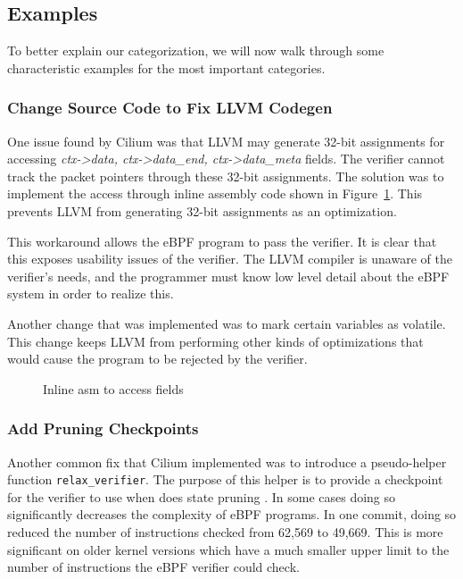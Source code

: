 \subsection{Examples}
To better explain our categorization, we will now walk through some characteristic examples for the most important categories.

\subsubsection{Change Source Code to Fix LLVM Codegen}
One issue found by Cilium was that LLVM may generate 32-bit assignments for accessing \emph{ctx->data, ctx->data\_end, ctx->data\_meta} fields.
The verifier cannot track the packet pointers through these 32-bit assignments.
The solution was to implement the access through inline assembly code shown in Figure~\ref{fig:inline-asm}.
This prevents LLVM from generating 32-bit assignments as an optimization.



This workaround allows the eBPF program to pass the verifier.
It is clear that this exposes usability issues of the verifier.
The LLVM compiler is unaware of the verifier's needs, and the programmer must know low level detail about the eBPF system in order to realize this.

Another change that was implemented was to mark certain variables as volatile.
This change keeps LLVM from performing other kinds of optimizations that would cause the program to be rejected by the verifier.

\begin{figure}
    
    \caption{Inline asm to access fields}
    \label{fig:inline-asm}
\end{figure}

\subsubsection{Add Pruning Checkpoints}
Another common fix that Cilium implemented was to introduce a pseudo-helper function \texttt{relax\_verifier}.
The purpose of this helper is to provide a checkpoint for the verifier to use when does state pruning
.
In some cases doing so significantly decreases the complexity of eBPF programs.
In one commit, doing so reduced the number of instructions checked from 62,569 to 49,669.
This is more significant on older kernel versions which have a much smaller upper limit to the number of instructions the eBPF verifier could check.

